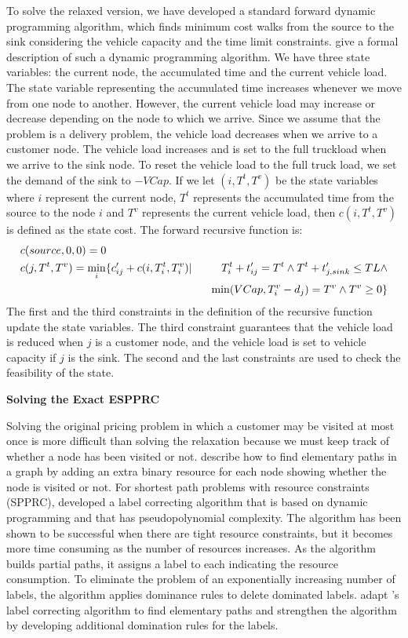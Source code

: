 To solve the relaxed version, we have developed a standard forward dynamic programming algorithm, which finds 
minimum cost walks from the source 
to the sink considering the vehicle capacity and the time limit constraints. \citet{Beasley} give a formal 
description of such a dynamic programming algorithm.  
We have three state variables: the current node, the accumulated time and the current vehicle load.
The state variable representing the accumulated time increases  whenever we move
from one node to another. However, the current vehicle load may increase or decrease
depending on the node to which we arrive. Since we assume that the problem is a delivery problem,  
the vehicle load decreases when we arrive to a customer node.  The vehicle load increases and
is set to the full truckload when we arrive to the sink node. To reset the vehicle load to the full truck 
load, we set the demand of the sink to $-VCap$. If we let $(i, T^t, T^v)$ be the state variables where 
$i$ represent the current node, $T^t$ represents
the accumulated time from the source to the node $i$ and  $T^v$ represents the current vehicle load, then
$c(i, T^t, T^v)$ is defined as the state cost. The forward recursive function is:
\begin{eqnarray*}
&c (source,0,0)    =   0 \hspace{3.02cm} & \\
&c (j, T^t, T^v)   =   \min_{i} \{ c'_{ij}+c(i,T_i^t,T_i^v)| &T_i^t+t'_{ij}= T^t \land T^t+t'_{j,sink}\leq TL \land \\
                        & &\min(VCap,T_i^v-d_j)=T^v \land T^v \geq 0\}
\end{eqnarray*}
The first and the third constraints in the definition of the recursive function update the state variables. 
The third constraint guarantees that the vehicle load is reduced when $j$ is a customer node, and
the vehicle load is set to vehicle capacity if $j$ is the sink. The second and 
the last constraints are used to check the feasibility of the state. 


{\bf Solving the Exact ESPPRC }

Solving the original pricing problem in which a customer may be visited at most once is more difficult
than solving the relaxation because we must keep track of whether a node has been visited
or not. \citet{Beasley} describe how to 
find elementary paths in a graph by adding an extra binary resource for each node showing 
whether the node is visited or not.
For  shortest path problems with resource constraints (SPPRC), \citet{Desrochers}  
developed a label correcting algorithm that is based on dynamic programming and that has  
pseudopolynomial complexity. The algorithm has been shown to be  successful when there 
are tight resource constraints, but it becomes more time consuming as the number of resources increases. 
As the algorithm builds partial paths, it assigns a label to each 
indicating the resource consumption. To eliminate the problem of an exponentially 
increasing number of labels, the algorithm applies dominance rules to delete dominated labels. 
\citet{Feillet} adapt \citeauthor{Desrochers}'s label correcting 
algorithm to find elementary paths and strengthen the algorithm by developing additional domination 
rules for the labels. 

